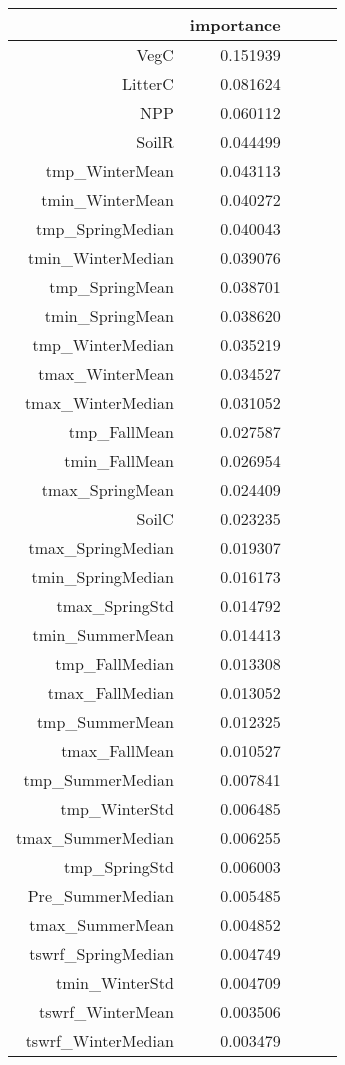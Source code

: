 \begin{table}[h]
\centering
\label{table:5}
\begin{tabular}{rrrrr}
\toprule
 & importance \\
\midrule
VegC & 0.151939 \\
LitterC & 0.081624 \\
NPP & 0.060112 \\
SoilR & 0.044499 \\
tmp_WinterMean & 0.043113 \\
tmin_WinterMean & 0.040272 \\
tmp_SpringMedian & 0.040043 \\
tmin_WinterMedian & 0.039076 \\
tmp_SpringMean & 0.038701 \\
tmin_SpringMean & 0.038620 \\
tmp_WinterMedian & 0.035219 \\
tmax_WinterMean & 0.034527 \\
tmax_WinterMedian & 0.031052 \\
tmp_FallMean & 0.027587 \\
tmin_FallMean & 0.026954 \\
tmax_SpringMean & 0.024409 \\
SoilC & 0.023235 \\
tmax_SpringMedian & 0.019307 \\
tmin_SpringMedian & 0.016173 \\
tmax_SpringStd & 0.014792 \\
tmin_SummerMean & 0.014413 \\
tmp_FallMedian & 0.013308 \\
tmax_FallMedian & 0.013052 \\
tmp_SummerMean & 0.012325 \\
tmax_FallMean & 0.010527 \\
tmp_SummerMedian & 0.007841 \\
tmp_WinterStd & 0.006485 \\
tmax_SummerMedian & 0.006255 \\
tmp_SpringStd & 0.006003 \\
Pre_SummerMedian & 0.005485 \\
tmax_SummerMean & 0.004852 \\
tswrf_SpringMedian & 0.004749 \\
tmin_WinterStd & 0.004709 \\
tswrf_WinterMean & 0.003506 \\
tswrf_WinterMedian & 0.003479 \\

\end{tabular}
\end{table}
